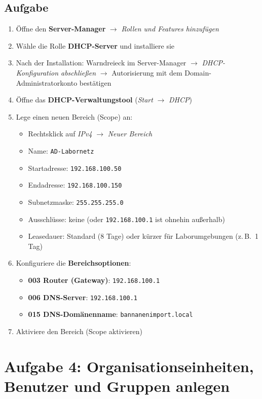 \documentclass[11pt, oneside, numbers=noenddot]{scrbook}
\begin{document}
\subsection*{Aufgabe}
\begin{enumerate}
  \item Öffne den \textbf{Server-Manager} $\rightarrow$ \textit{Rollen und Features hinzufügen}
  \item Wähle die Rolle \textbf{DHCP-Server} und installiere sie
  \item Nach der Installation: Warndreieck im Server-Manager $\rightarrow$ \textit{DHCP-Konfiguration abschließen} $\rightarrow$ Autorisierung mit dem Domain-Administratorkonto bestätigen
  \item Öffne das \textbf{DHCP-Verwaltungstool} (\textit{Start} $\rightarrow$ \textit{DHCP})
  \item Lege einen neuen Bereich (Scope) an:
  \begin{itemize}
    \item Rechtsklick auf \textit{IPv4} $\rightarrow$ \textit{Neuer Bereich}
    \item Name: \texttt{AD-Labornetz}
    \item Startadresse: \texttt{192.168.100.50}
    \item Endadresse: \texttt{192.168.100.150}
    \item Subnetzmaske: \texttt{255.255.255.0}
    \item Ausschlüsse: keine (oder \texttt{192.168.100.1} ist ohnehin außerhalb)
    \item Leasedauer: Standard (8 Tage) oder kürzer für Laborumgebungen (z.\,B.\ 1 Tag)
  \end{itemize}
  \item Konfiguriere die \textbf{Bereichsoptionen}:
  \begin{itemize}
    \item \textbf{003 Router (Gateway)}: \texttt{192.168.100.1}
    \item \textbf{006 DNS-Server}: \texttt{192.168.100.1}
    \item \textbf{015 DNS-Domänenname}: \texttt{bannanenimport.local}
  \end{itemize}
  \item Aktiviere den Bereich (Scope aktivieren)
\end{enumerate}


\section{Aufgabe 4: Organisationseinheiten, Benutzer und Gruppen anlegen}
\end{document}
